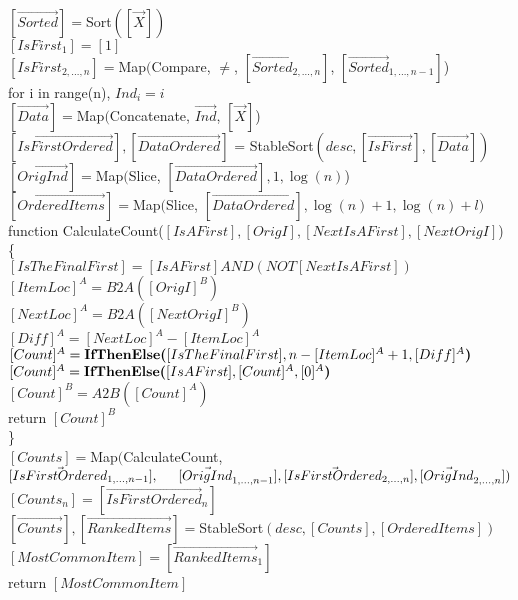 \begin{protocol}[MostCommonItem$({[\vec{X}]^B})$]
	$[\vec{Sorted}] = $Sort$([\vec{X}])$ \\
	$[IsFirst_1] = [1]$ \\
	$[IsFirst_{2, \ldots, n}] = $Map$($Compare, $\neq$, $[\vec{Sorted}_{2, \ldots, n}]$, 
		$[\vec{Sorted}_{1, \ldots, n-1}]$) \\
	for i in range(n), $Ind_i = i$\\
	$[\vec{Data}] = $Map$($Concatenate, $\vec{Ind}$, $[\vec{X}]$) \\
	$[\vec{IsFirstOrdered}], [\vec{DataOrdered}]$ = 
		StableSort$(desc, [\vec{IsFirst}], [\vec{Data}])$ \\
	$[\vec{OrigInd}] = $Map$($Slice, $[\vec{DataOrdered}], 1, \log(n)$) \\
	$[\vec{OrderedItems}] = $Map$($Slice, $[\vec{DataOrdered}], \log(n)+1, \log(n) + l)$ \\
	function CalculateCount($[IsAFirst], [OrigI], [NextIsAFirst], [NextOrigI]$) \{ \\
		\indent $[IsTheFinalFirst] = [IsAFirst] AND (NOT [NextIsAFirst])$ \\
		\indent $[ItemLoc]^A = B2A([OrigI]^B)$ \\
		\indent $[NextLoc]^A = B2A([NextOrigI]^B)$ \\
		\indent $[Diff]^A = [NextLoc]^A - [ItemLoc]^A$ \\
		\indent $[Count]^A = \textbf{IfThenElse(}[IsTheFinalFirst], n - [ItemLoc]^A + 1, [Diff]^A\textbf{)}$\\
		\indent $[Count]^A = \textbf{IfThenElse(}[IsAFirst], [Count]^A, [0]^A\textbf{)}$\\
		\indent $[Count]^B = A2B([Count]^A) $\\
		\indent return $[Count]^B$ \\
	\} \\

	\noindent $[Counts] = $Map$($CalculateCount, $[\vec{IsFirstOrdered}_{1, \ldots, n-1}], \\		\indent	[\vec{OrigInd}_{1, \ldots, n-1}], 
		 	[\vec{IsFirstOrdered}_{2, \ldots, n}],
			[\vec{OrigInd}_{2, \ldots, n}])$ \\
	$[Counts_n] = [\vec{IsFirstOrdered}_n]$ \\
	$[\vec{Counts}], [\vec{RankedItems}] = $StableSort$(desc, [Counts], [OrderedItems])$ \\
	$[MostCommonItem] = [\vec{RankedItems}_1]$ \\
	return $[MostCommonItem]$ \\
\end{protocol}


